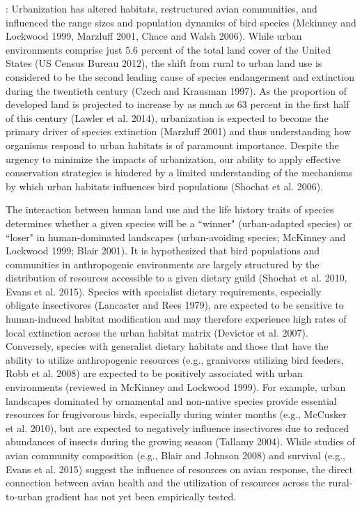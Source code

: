 \documentclass[12pt]{article}
\date{}
\begin{document}
\maketitle \vspace{-2cm}


\doublespace
{}: Urbanization has altered habitats, restructured avian communities, and influenced the range sizes and population dynamics of bird species (Mckinney and Lockwood 1999, Marzluff 2001, Chace and Walsh 2006). While urban environments comprise just 5.6 percent of the total land cover of the United States (US Census Bureau 2012), the shift from rural to urban land use is considered to be the second leading cause of species endangerment and extinction during the twentieth century (Czech and Krausman 1997). As the proportion of developed land is projected to increase by as much as 63 percent in the first half of this century (Lawler et al. 2014), urbanization is expected to become the primary driver of species extinction (Marzluff 2001) and thus understanding how organisms respond to urban habitats is of paramount importance. Despite the urgency to minimize the impacts of urbanization, our ability to apply effective conservation strategies is hindered by a limited understanding of the mechanisms by which urban habitats influences bird populations (Shochat et al. 2006). \par

The interaction between human land use and the life history traits of species determines whether a given species will be a ``winner" (urban-adapted species) or ``loser" in human-dominated landscapes (urban-avoiding species; McKinney and Lockwood 1999; Blair 2001). It is hypothesized that bird populations and communities in anthropogenic environments are largely structured by the distribution of resources accessible to a given dietary guild (Shochat et al. 2010, Evans et al. 2015). Species with specialist dietary requirements, especially obligate insectivores (Lancaster and Rees 1979), are expected to be sensitive to human-induced habitat modification and may therefore experience high rates of local extinction across the urban habitat matrix (Devictor et al. 2007). Conversely, species with generalist dietary habitats and those that have the ability to utilize anthropogenic resources (e.g., granivores utilizing bird feeders, Robb et al. 2008) are expected to be positively associated with urban environments (reviewed in McKinney and Lockwood 1999). For example, urban landscapes dominated by ornamental and non-native species provide essential resources for frugivorous birds, especially during winter months (e.g., McCusker et al. 2010), but are expected to negatively influence insectivores due to reduced abundances of insects during the growing season (Tallamy 2004). While studies of avian community composition (e.g., Blair and Johnson 2008) and survival (e.g., Evans et al. 2015) suggest the influence of resources on avian response, the direct connection between avian health and the utilization of resources across the rural-to-urban gradient has not yet been empirically tested.\par
\end{document}
